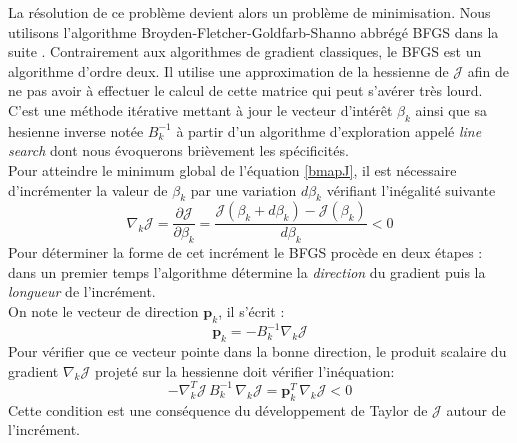 \documentclass[a4paper,12pt]{article}
\newcommand{\bepar}[1]{
	\left( #1 \right)  
}
\newcommand{\J}{\mathcal{J}}
\numberwithin{equation}{section} %
\begin{document}
\noindent La résolution de ce problème devient alors un problème de minimisation. Nous utilisons l'algorithme Broyden-Fletcher-Goldfarb-Shanno abbrégé BFGS dans la suite \citep{nocedal2006numerical}.
Contrairement aux algorithmes de gradient classiques, le BFGS est un algorithme d'ordre deux. Il utilise une approximation de la hessienne de $\J$ afin de ne pas avoir à effectuer le calcul de cette matrice qui peut s'avérer très lourd.\\
C'est une méthode itérative mettant à jour le vecteur d'intérêt $\beta_k$ ainsi que sa hesienne inverse notée $B^{-1}_k$ à partir d'un algorithme d'exploration appelé \textit{line search} dont nous évoquerons brièvement les spécificités.\\
Pour atteindre le minimum global de l'équation \eqref{bmapJ}, il est nécessaire d'incrémenter la valeur de $\beta_k$ par une variation $d\beta_k$ vérifiant l'inégalité suivante
\begin{equation}
\nabla_k\J = \frac{\partial \J}{\partial \beta_k} = \frac{\J\bepar{\beta_k+ d\beta_k} - \J\bepar{\beta_k}}{d\beta_k} < 0
\end{equation}
Pour déterminer la forme de cet incrément le BFGS procède en deux étapes : dans un premier temps l'algorithme détermine la \textit{direction} du gradient puis la \textit{longueur} de l'incrément. \\
On note le vecteur de direction $\mathbf{p}_k$, il s'écrit :
\begin{equation}
\mathbf{p}_k = -B_k^{-1}\nabla_k\J
\end{equation}
Pour vérifier que ce vecteur pointe dans la bonne direction, le produit scalaire du gradient $\nabla_k\J$ projeté sur la hessienne doit vérifier l'inéquation:
\begin{equation}
-\nabla_k^T\J\, B_k^{-1}\, \nabla_k\J = \mathbf{p}_k^T\, \nabla_k\J < 0
\end{equation}
Cette condition est une conséquence du développement de Taylor de $\J$ autour de l'incrément.\\
\end{document}
